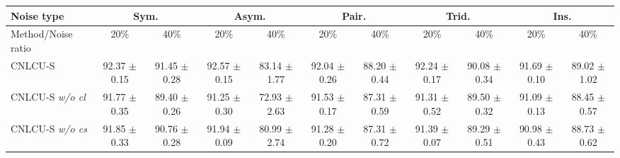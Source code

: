 \documentclass[11pt]{article}
\begin{document}
\begin{table}[!htbp]
    \small
\centering
	\begin{tabular}{l |cc|cc|cc|cc|cc} 
		\Xhline{3\arrayrulewidth}	 	
		   Noise type &\multicolumn{2}{c|}{Sym.}&\multicolumn{2}{c|}{Asym.}&\multicolumn{2}{c|}{Pair.}&\multicolumn{2}{c|}{Trid.}&\multicolumn{2}{c}{Ins.}\\
			\hline
		   Method/Noise ratio&  20\% & 40\%& 20\% & 40\% &20\% & 40\%& 20\% & 40\% & 20\% & 40\%\\
			\hline
			CNLCU-S	& \makecell{92.37\\ $\pm$\scriptsize{0.15}}
			& \makecell{91.45\\ $\pm$\scriptsize{0.28}}
			& \makecell{92.57\\ $\pm$\scriptsize{0.15}}
			& \makecell{83.14\\ $\pm$\scriptsize{1.77}}
			& \makecell{92.04\\ $\pm$\scriptsize{0.26}}
			& \makecell{88.20\\ $\pm$\scriptsize{0.44}}
			& \makecell{92.24\\ $\pm$\scriptsize{0.17}}
			& \makecell{90.08\\ $\pm$\scriptsize{0.34}}
			& \makecell{91.69\\ $\pm$\scriptsize{0.10}}
			& \makecell{89.02\\ $\pm$\scriptsize{1.02}}\\\hline
			CNLCU-S \textit{w/o cl} & \makecell{91.77\\ $\pm$\scriptsize{0.35}} & \makecell{89.40\\ $\pm$\scriptsize{0.26}} & \makecell{91.25\\ $\pm$\scriptsize{0.30}} & \makecell{72.93\\ $\pm$\scriptsize{2.63}} & \makecell{91.53\\ $\pm$\scriptsize{0.17}} & \makecell{87.31\\ $\pm$\scriptsize{0.59}} & \makecell{91.31\\ $\pm$\scriptsize{0.52}} & \makecell{89.50\\ $\pm$\scriptsize{0.32}} & \makecell{91.09\\ $\pm$\scriptsize{0.13}} & \makecell{88.45\\ $\pm$\scriptsize{0.57}}\\	  
			\hline
			CNLCU-S \textit{w/o cs}& \makecell{91.85\\ $\pm$\scriptsize{0.33}} & \makecell{90.76\\ $\pm$\scriptsize{0.28}} & \makecell{91.94\\ $\pm$\scriptsize{0.09}} & \makecell{80.99\\ $\pm$\scriptsize{2.74}} & \makecell{91.28\\ $\pm$\scriptsize{0.20}} & \makecell{87.31\\ $\pm$\scriptsize{0.72}} & \makecell{91.39\\ $\pm$\scriptsize{0.07}} & \makecell{89.29\\ $\pm$\scriptsize{0.51}} & \makecell{90.98\\ $\pm$\scriptsize{0.43}} & \makecell{88.73\\ $\pm$\scriptsize{0.62}} \\	  

\end{tabular}
\end{table}
\end{document}

